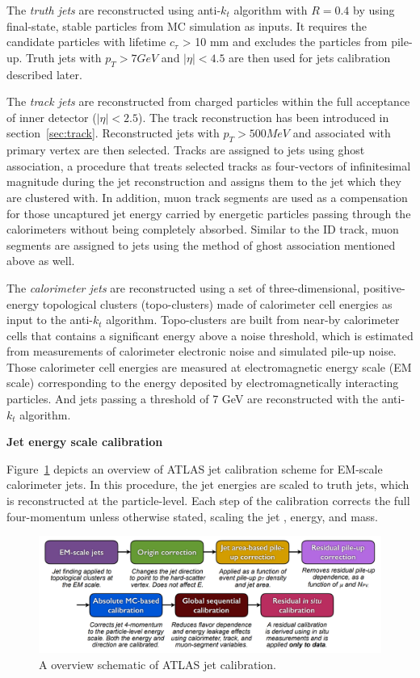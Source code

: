 The \textit{truth jets} are reconstructed using anti-$k_{t}$ algorithm with $R = 0.4$ by using final-state, stable particles from MC simulation as inputs.
It requires the candidate particles with lifetime $c_{\tau}$ > 10 mm and excludes the particles from pile-up.
Truth jets with $p_{T} > 7 GeV$ and $|\eta| < 4.5$ are then used for jets calibration described later.

The \textit{track jets} are reconstructed from charged particles within the full acceptance of inner detector ($|\eta| < 2.5$).
The track reconstruction has been introduced in section~\ref{sec:track}.
Reconstructed jets with $p_{T} > 500 MeV$ and associated with primary vertex are then selected.
Tracks are assigned to jets using ghost association\cite{CACCIARI2008119}, a procedure that treats selected tracks as four-vectors of infinitesimal magnitude during the jet reconstruction and assigns them to the jet which they are clustered with.
In addition, muon track segments are used as a compensation for those uncaptured jet energy carried by energetic particles passing through the calorimeters without being completely absorbed.
Similar to the ID track, muon segments are assigned to jets using the method of ghost association mentioned above as well.

The \textit{calorimeter jets} are reconstructed using a set of three-dimensional, positive-energy topological clusters (topo-clusters) made of calorimeter cell energies as input to the anti-$k_{t}$ algorithm\cite{Aaboud:2017jcu}.
Topo-clusters are built from near-by calorimeter cells that contains a significant energy above a noise threshold,
which is estimated from measurements of calorimeter electronic noise and simulated pile-up noise.
Those calorimeter cell energies are measured at electromagnetic energy scale (EM scale) corresponding to the energy deposited by electromagnetically interacting particles. 
And jets passing a \pt threshold of 7 GeV are reconstructed with the anti-$k_{t}$ algorithm.

\textbf{Jet energy scale calibration}

Figure~\ref{fig:jet_cali} depicts an overview of ATLAS jet calibration scheme for EM-scale calorimeter jets.
In this procedure, the jet energies are scaled to truth jets, which is reconstructed at the particle-level.
Each step of the calibration corrects the full four-momentum unless otherwise stated, scaling the jet \pt, energy, and mass.
\begin{figure}[!htb]
  \centering
  \includegraphics[width=1.0\textwidth]{figures/Simulation/jet_calibration.png}
  \caption{A overview schematic of ATLAS jet calibration\cite{Aaboud:2017jcu}.}
  \label{fig:jet_cali}
\end{figure}

